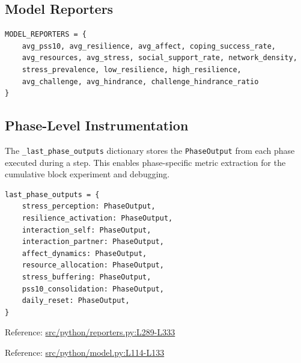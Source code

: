 \documentclass[
  letterpaper,
  DIV=11,
  numbers=noendperiod]{scrartcl}
\begin{document}
\subsection{Model Reporters}\label{model-reporters}

\begin{verbatim}
MODEL_REPORTERS = {
    avg_pss10, avg_resilience, avg_affect, coping_success_rate,
    avg_resources, avg_stress, social_support_rate, network_density,
    stress_prevalence, low_resilience, high_resilience,
    avg_challenge, avg_hindrance, challenge_hindrance_ratio
}
\end{verbatim}

\subsection{Phase-Level
Instrumentation}\label{phase-level-instrumentation}

The \texttt{\_last\_phase\_outputs} dictionary stores the
\texttt{PhaseOutput} from each phase executed during a step. This
enables phase-specific metric extraction for the cumulative block
experiment and debugging.

\begin{verbatim}
last_phase_outputs = {
    stress_perception: PhaseOutput,
    resilience_activation: PhaseOutput,
    interaction_self: PhaseOutput,
    interaction_partner: PhaseOutput,
    affect_dynamics: PhaseOutput,
    resource_allocation: PhaseOutput,
    stress_buffering: PhaseOutput,
    pss10_consolidation: PhaseOutput,
    daily_reset: PhaseOutput,
}
\end{verbatim}

Reference:
\href{https://github.com/namakala/abm-simulation/blob/84ff9b37fb0c569bef9f122e789d9c23a89348ec/src/python/reporters.py\#L289-L333}{src/python/reporters.py:L289-L333}

Reference:
\href{https://github.com/namakala/abm-simulation/blob/84ff9b37fb0c569bef9f122e789d9c23a89348ec/src/python/model.py\#L114-L133}{src/python/model.py:L114-L133}
\end{document}
